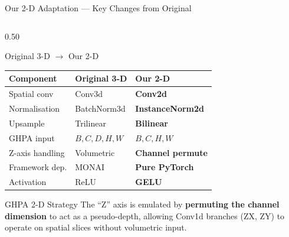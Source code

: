 \documentclass[aspectratio=169,10pt]{beamer}
\begin{document}
\begin{frame}{Our 2-D Adaptation --- Key Changes from Original}
  \begin{columns}[T]
    \begin{column}{0.50\textwidth}
      \begin{block}{Original 3-D $\to$ Our 2-D}
        \begin{tabular}{lll}
          \toprule
          \textbf{Component}  & \textbf{Original 3-D} & \textbf{Our 2-D}\\
          \midrule
          Spatial conv        & Conv3d           & \textbf{Conv2d}\\
          Normalisation       & BatchNorm3d      & \textbf{InstanceNorm2d}\\
          Upsample            & Trilinear        & \textbf{Bilinear}\\
          GHPA input          & $B,C,D,H,W$      & \textbf{$B,C,H,W$}\\
          Z-axis handling     & Volumetric       & \textbf{Channel permute}\\
          Framework dep.      & MONAI            & \textbf{Pure PyTorch}\\
          Activation          & ReLU             & \textbf{GELU}\\
          \bottomrule
        \end{tabular}
      \end{block}

      \vspace{4pt}
      \begin{alertblock}{GHPA 2-D Strategy}
        The ``Z'' axis is emulated by \textbf{permuting the channel dimension}
        to act as a pseudo-depth, allowing Conv1d branches (ZX, ZY) to
        operate on spatial slices without volumetric input.
      \end{alertblock}
    \end{column}


\end{columns}
\end{frame}
\end{document}
